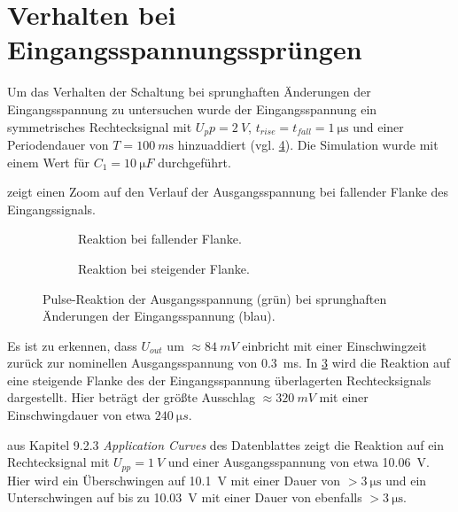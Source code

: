 	\section{Verhalten bei Eingangsspannungssprüngen}
		Um das Verhalten der Schaltung bei sprunghaften Änderungen der Eingangsspannung zu untersuchen wurde der Eingangsspannung ein symmetrisches Rechtecksignal
		mit \({U_pp} = \SI{2}{V}\), \(t_{rise} = t_{fall} = \SI{1}{\micro \second}\) und einer Periodendauer von \(T = \SI{100}{m \second}\) hinzuaddiert (vgl. \cref{fig:pulsefigs}).
		Die Simulation wurde mit einem Wert für \(C_1 = \SI{10}{\micro F}\) durchgeführt.\par\medskip
		 zeigt einen Zoom auf den Verlauf der Ausgangsspannung bei fallender Flanke des Eingangssignals.
		\begin{figure}[h]
			\centering
			\begin{subfigure}[t]{\textwidth}
				\centering
				
				\caption{}
				\label{subfig:pulse}
			\end{subfigure}
			\begin{subfigure}[l]{.45\textwidth}
				\centering
				
				\caption{Reaktion bei fallender Flanke.}
				\label{subfig:sag}
			\end{subfigure}
			\hfill
			\begin{subfigure}[r]{.45\textwidth}
				\centering
				
				\caption{Reaktion bei steigender Flanke.}
				\label{subfig:spike}
			\end{subfigure}
			\caption[Puls-Reaktion der Ausgangsspannung bei sprunghaften Änderungen der Eingangsspannung]{Pulse-Reaktion der Ausgangsspannung (grün) bei sprunghaften Änderungen der Eingangsspannung (blau).}
			\label{fig:pulsefigs}
		\end{figure}
		Es ist zu erkennen, dass \(U_{out}\) um \(\approx \SI{84}{mV}\) einbricht mit einer Einschwingzeit zurück zur nominellen Ausgangsspannung von \SI{0,3}{ms}.
		In \cref{subfig:spike} wird die Reaktion auf eine steigende Flanke des der Eingangsspannung überlagerten Rechtecksignals dargestellt.
		Hier beträgt der größte Ausschlag \(\approx \SI{320}{mV}\) mit einer Einschwingdauer von etwa \(\SI{240}{\micro s}\).\par\medskip
		 aus Kapitel 9.2.3 \textit{Application Curves} des Datenblattes zeigt die Reaktion auf ein Rechtecksignal mit \(U_{pp} = \SI{1}{V}\)
		und einer Ausgangsspannung von etwa \SI{10,06}{V}. Hier wird ein Überschwingen auf \SI{10,1}{V} mit einer Dauer von \(> \SI{3}{\micro \second}\)
		und ein Unterschwingen auf bis zu \SI{10,03}{V} mit einer Dauer von ebenfalls \(> \SI{3}{\micro \second}\).
